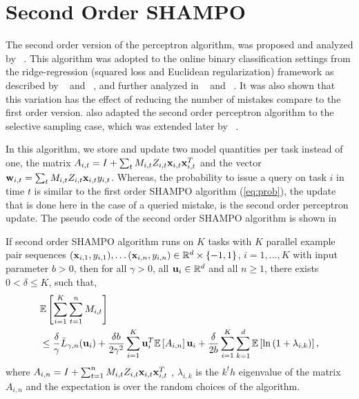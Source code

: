 \section{Second Order SHAMPO}
The second order version of the perceptron algorithm, was proposed and analyzed by 
~\cite{CesaBianchiCoGe05}. This algorithm was adopted to the online binary classification 
settings from the ridge-regression (squared loss and Euclidean regularization) framework as described by 
~\cite{hoerl1970ridge} and ~\cite{Vovk97}, and further analyzed in ~\cite{AzouryWa01} and  ~\cite{forster2002relative}. 
It was also shown that this variation has the effect of reducing the number of mistakes compare to the first order version. 
\cite{cesa2006worst} also adapted the second order perceptron algorithm to the selective sampling case, 
which was extended later by ~\cite{crammer2014doubly}.

In this algorithm, we store and update two model quantities per task instead of one, the matrix 
$A_{i,t} = I+\sum_{t}M_{i,t}Z_{i,t}\mathbf{x}_{i,t}\mathbf{x}_{i,t}^T$ and the vector $\mathbf{w}_{i,t} = \sum_{t}M_{i,t}Z_{i,t} \mathbf{x}_{i,t}  y_{i,t}$.
Whereas, the probability to issue a query on task $i$ in time $t$ is similar to the first order SHAMPO 
algorithm (\eqref{eq:prob}),
the update that is done here in the case of a queried mistake, is the second order perceptron update.  
The pseudo code of the second order SHAMPO algorithm is shown in 

\begin{theorem}
  If second order SHAMPO algorithm runs on $K$ tasks with $K$ parallel example pair
  sequences
  $(\mathbf{x}_{i,1},y_{i,1}),\ldots (\mathbf{x}_{i,n},y_{i,n})\in\mathbb{R}^d\times\{-1,1\}$,
  $i=1,...,K$ with input parameter $b>0$, then for all $\gamma>0$, all
  $\mathbf{u}_{i}\in\mathbb{R}^d$ and all $n\ge1$, there exists $0<\delta\le K$, such that,
  \begin{equation*}
  \begin{split}
   &\mathbb{E}\left[{\sum_{i=1}^{K}\sum_{t=1}^{n}{M_{i,t}}}\right] \\
   &\le \frac{\delta}{\gamma}{\bar L}_{\gamma,n}(\mathbf{u}_{i})
+ \frac{\delta b}{2\gamma^2}\sum_{i=1}^{K}\mathbf{u}_i^T\mathbb{E}\left[{A_{i,n}}\right]\mathbf{u}_i+ 
\frac{\delta}{2b}\sum_{i=1}^{K}\sum_{k=1}^{d}\mathbb{E}\left[{\ln\left({1+\lambda_{i,k}}\right)}\right],
\end{split}
\end{equation*} 
 where $A_{i,n} = I+\sum_{t=1}^{n}M_{i,t}Z_{i,t}\mathbf{x}_{i,t}\mathbf{x}_{i,t}^T$ , $\lambda_{i,k}$ is the $k^th$ eigenvalue
 of the matrix $A_{i,n}$ and the expectation is over the random choices of the algorithm.
\end{theorem} \label{thm:SO_bound}

